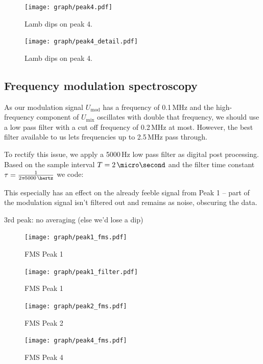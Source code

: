 \begin{figure}[p]
	\centering
	\texttt{[image: graph/peak4.pdf]}
	\vspace{-2ex}
	\caption{Lamb dips on peak 4.}
	\label{fig:P4f}
	\vspace{2ex}

	\texttt{[image: graph/peak4\_detail.pdf]}
	\vspace{-2ex}
	\caption{Lamb dips on peak 4. }
	\label{fig:P4}
	\vspace{-2em}
\end{figure}

\subsection{Frequency modulation spectroscopy}

As our modulation signal $U_\text{mod}$ has a frequency of 0.1\,MHz and the high-frequency component of $U_\text{mix}$ oscillates with double that frequency, we should use a low pass filter with a cut off frequency of 0.2\,MHz at most. However,  the best filter available to us lets frequencies  up to 2.5\,MHz pass through.

To rectify this issue, we apply a 5000\,Hz low pass filter as digital post processing. Based on the sample interval $T = 2\,\micro\second$ and the filter time constant $\tau = \frac{1}{2 \pi \cdt 5000\,\hertz}$ we code:



This especially has an effect on the already feeble signal from Peak 1 -- part of the modulation signal isn't filtered out and remains as noise, obscuring the data.

3rd peak: no averaging (else we'd lose a dip)


\begin{figure}[p]
	\centering
	\texttt{[image: graph/peak1\_fms.pdf]}
	\vspace{-2ex}
	\caption{FMS Peak 1}
	\label{fig:P1_fms}
	\vspace{2ex}

	\texttt{[image: graph/peak1\_filter.pdf]}
	\vspace{-2ex}
	\caption{FMS Peak 1}
	\label{fig:P1_filter}
	\vspace{-2em}
\end{figure}

\begin{figure}[p]
	\centering
	\texttt{[image: graph/peak2\_fms.pdf]}
	\vspace{-2ex}
	\caption{FMS Peak 2}
	\label{fig:P2_fms}
	\vspace{2ex}

	\texttt{[image: graph/peak4\_fms.pdf]}
	\vspace{-2ex}
	\caption{FMS Peak 4}
	\label{fig:P4_fms}
	\vspace{-2em}
\end{figure}

